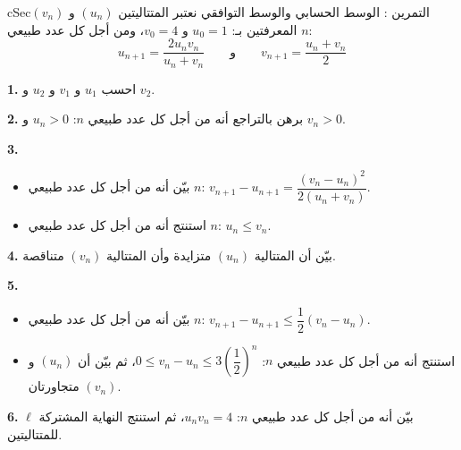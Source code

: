 \documentclass[12pt,a4paper]{article}
\newenvironment{BOX}[2]{\begin{otherlanguage}{english}\begin{arbox}{#1}{#2}}{\end{arbox}\end{otherlanguage}}
\newcounter{exo}
\newenvironment{tamrin}[1]{\stepcounter{exo}\begin{BOX}{cSec}{التمرين \theexo: #1}}{\end{BOX}}
\newenvironment{sq}{\begin{itemize}[leftmargin=2.4em,itemsep=3pt]}{\end{itemize}}
\newcommand{\qa}{\item[(أ)]}\newcommand{\qb}{\item[(ب)]}\newcommand{\qc}{\item[(جـ)]}\newcommand{\qd}{\item[(د)]}\newcommand{\qe}{\item[(هـ)]}
\newcommand{\QQ}[1]{\par\smallskip\textbf{#1.} }
\begin{document}
\begin{tamrin}{الوسط الحسابي والوسط التوافقي}
نعتبر المتتاليتين $(u_n)$ و $(v_n)$ المعرفتين بـ: $u_0=1$ و $v_0=4$، ومن أجل كل عدد طبيعي $n$:
\[u_{n+1}=\frac{2u_nv_n}{u_n+v_n}\qquad\text{و}\qquad v_{n+1}=\frac{u_n+v_n}{2}\]
\QQ{1} احسب $u_1$ و $v_1$ و $u_2$ و $v_2$.
\QQ{2} برهن بالتراجع أنه من أجل كل عدد طبيعي $n$: $u_n>0$ و $v_n>0$.
\QQ{3}
\begin{sq}
\qa بيّن أنه من أجل كل عدد طبيعي $n$: $v_{n+1}-u_{n+1}=\dfrac{\left(v_n-u_n\right)^2}{2\left(u_n+v_n\right)}$.
\qb استنتج أنه من أجل كل عدد طبيعي $n$: $u_n\leqslant v_n$.
\end{sq}
\QQ{4} بيّن أن المتتالية $(u_n)$ متزايدة وأن المتتالية $(v_n)$ متناقصة.
\QQ{5}
\begin{sq}
\qa بيّن أنه من أجل كل عدد طبيعي $n$: $v_{n+1}-u_{n+1}\leqslant\dfrac12\left(v_n-u_n\right)$.
\qb استنتج أنه من أجل كل عدد طبيعي $n$: $0\leqslant v_n-u_n\leqslant3\left(\dfrac12\right)^n$، ثم بيّن أن $(u_n)$ و $(v_n)$ متجاورتان.
\end{sq}
\QQ{6} بيّن أنه من أجل كل عدد طبيعي $n$: $u_nv_n=4$، ثم استنتج النهاية المشتركة $\ell$ للمتتاليتين.
\end{tamrin}
\end{document}
